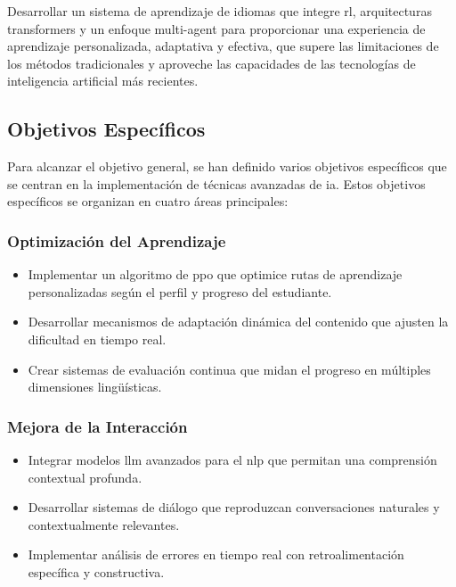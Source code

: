 Desarrollar un sistema de aprendizaje de idiomas que integre \gls{rl}, arquitecturas \gls{transformers} y un enfoque \gls{multi-agent} para proporcionar una experiencia de aprendizaje personalizada, adaptativa y efectiva, que supere las limitaciones de los métodos tradicionales y aproveche las capacidades de las tecnologías de inteligencia artificial más recientes.

\subsection{Objetivos Específicos}
\label{subsec:objetivos-especificos}

Para alcanzar el objetivo general, se han definido varios objetivos específicos que se centran en la implementación de técnicas avanzadas de \gls{ia}. Estos objetivos específicos se organizan en cuatro áreas principales:

\subsubsection{Optimización del Aprendizaje}
\label{subsubsec:optimizacion-aprendizaje}

\begin{itemize}
  \item Implementar un algoritmo de \gls{ppo} que optimice rutas de aprendizaje personalizadas según el perfil y progreso del estudiante.
  \item Desarrollar mecanismos de adaptación dinámica del contenido que ajusten la dificultad en tiempo real.
  \item Crear sistemas de evaluación continua que midan el progreso en múltiples dimensiones lingüísticas.
\end{itemize}

\subsubsection{Mejora de la Interacción}
\label{subsubsec:mejora-interaccion}

\begin{itemize}
  \item Integrar modelos \gls{llm} avanzados para el \gls{nlp} que permitan una comprensión contextual profunda.
  \item Desarrollar sistemas de diálogo que reproduzcan conversaciones naturales y contextualmente relevantes.
  \item Implementar análisis de errores en tiempo real con retroalimentación específica y constructiva.
\end{itemize}

